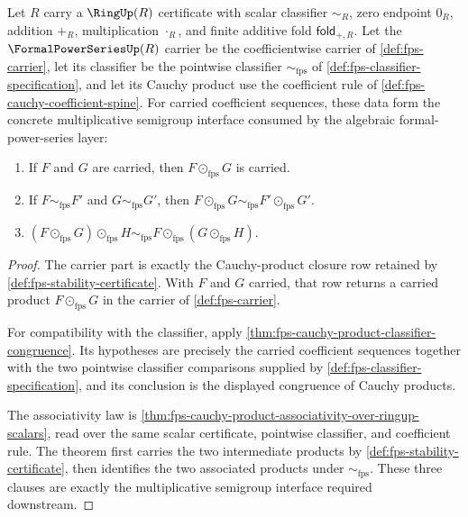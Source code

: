 \begin{theorem}
\label{thm:fps-cauchy-product-multiplicative-semigroup-laws}
Let $R$ carry a $\RingUp(R)$ certificate with scalar classifier $\sim_R$, zero endpoint $0_R$, addition $+_R$, multiplication $\cdot_R$, and finite additive fold $\mathsf{fold}_{+,R}$. Let the $\FormalPowerSeriesUp(R)$ carrier be the coefficientwise carrier of \autoref{def:fps-carrier}, let its classifier be the pointwise classifier $\sim_{\mathrm{fps}}$ of \autoref{def:fps-classifier-specification}, and let its Cauchy product use the coefficient rule of \autoref{def:fps-cauchy-coefficient-spine}. For carried coefficient sequences, these data form the concrete multiplicative semigroup interface consumed by the algebraic formal-power-series layer:
\begin{enumerate}
  \item If $F$ and $G$ are carried, then $F\odot_{\mathrm{fps}}G$ is carried.
  \item If $F\sim_{\mathrm{fps}}F'$ and $G\sim_{\mathrm{fps}}G'$, then $F\odot_{\mathrm{fps}}G\sim_{\mathrm{fps}}F'\odot_{\mathrm{fps}}G'$.
  \item $(F\odot_{\mathrm{fps}}G)\odot_{\mathrm{fps}}H\sim_{\mathrm{fps}}F\odot_{\mathrm{fps}}(G\odot_{\mathrm{fps}}H)$.
\end{enumerate}
\end{theorem}
\begin{proof}
The carrier part is exactly the Cauchy-product closure row retained by \autoref{def:fps-stability-certificate}. With $F$ and $G$ carried, that row returns a carried product $F\odot_{\mathrm{fps}}G$ in the carrier of \autoref{def:fps-carrier}.

For compatibility with the classifier, apply \autoref{thm:fps-cauchy-product-classifier-congruence}. Its hypotheses are precisely the carried coefficient sequences together with the two pointwise classifier comparisons supplied by \autoref{def:fps-classifier-specification}, and its conclusion is the displayed congruence of Cauchy products.

The associativity law is \autoref{thm:fps-cauchy-product-associativity-over-ringup-scalars}, read over the same scalar certificate, pointwise classifier, and coefficient rule. The theorem first carries the two intermediate products by \autoref{def:fps-stability-certificate}, then identifies the two associated products under $\sim_{\mathrm{fps}}$. These three clauses are exactly the multiplicative semigroup interface required downstream.
\end{proof}


